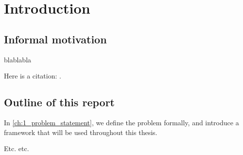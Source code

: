 \documentclass[../sample_report.tex]{subfiles}
\begin{document}
\setcounter{chapter}{-1}
\chapter{Introduction} \label{ch:0_introduction}

\section{Informal motivation}

blablabla

Here is a citation: \citep{kolmogorov_entropy_1959}.



\section{Outline of this report}

In \autoref{ch:1_problem_statement}, we define the problem formally, and introduce a framework that will be used throughout this thesis.

Etc. etc.
\end{document}
